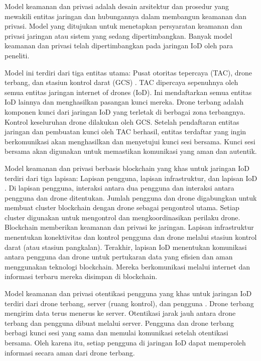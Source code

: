 Model keamanan dan privasi adalah desain arsitektur dan prosedur yang mewakili entitas jaringan dan hubungannya dalam membangun keamanan dan privasi. Model yang ditujukan untuk menetapkan persyaratan keamanan dan privasi jaringan atau sistem yang sedang dipertimbangkan. Banyak model keamanan dan privasi telah dipertimbangkan pada jaringan IoD oleh para peneliti.

Model ini terdiri dari tiga entitas utama: Pusat otoritas tepercaya (TAC), drone terbang, dan stasiun kontrol darat (GCS) \citep{tian2019efficient} \citep{yahuza2020systematic} \citep{chen2020traceable}. TAC dipercaya sepenuhnya oleh semua entitas jaringan internet of drones (IoD). Ini mendaftarkan semua entitas IoD lainnya dan menghasilkan pasangan kunci mereka. Drone terbang adalah komponen kunci dari jaringan IoD yang terletak di berbagai zona terbangnya. Kontrol keseluruhan drone dilakukan oleh GCS. Setelah pendaftaran entitas jaringan dan pembuatan kunci oleh TAC berhasil, entitas terdaftar yang ingin berkomunikasi akan menghasilkan dan menyetujui kunci sesi bersama. Kunci sesi bersama akan digunakan untuk memastikan komunikasi yang aman dan autentik. 

Model keamanan dan privasi berbasis blockchain yang khas untuk jaringan IoD terdiri dari tiga lapisan: Lapisan pengguna, lapisan infrastruktur, dan lapisan IoD \citep{bera2021private}. Di lapisan pengguna, interaksi antara dua pengguna dan interaksi antara pengguna dan drone ditentukan. Jumlah pengguna dan drone digabungkan untuk membuat cluster blockchain dengan drone sebagai pengontrol utama. Setiap cluster digunakan untuk mengontrol dan mengkoordinasikan perilaku drone. Blockchain memberikan keamanan dan privasi ke jaringan. Lapisan infrastruktur menentukan konektivitas dan kontrol pengguna dan drone melalui stasiun kontrol darat (atau stasiun pangkalan). Terakhir, lapisan IoD menentukan komunikasi antara pengguna dan drone untuk pertukaran data yang efisien dan aman menggunakan teknologi blockchain. Mereka berkomunikasi melalui internet dan informasi terbaru mereka disimpan di blockchain.

Model keamanan dan privasi otentikasi pengguna yang khas untuk jaringan IoD terdiri dari drone terbang, server (ruang kontrol), dan pengguna \citep{wazid2018design}. Drone terbang mengirim data terus menerus ke server. Otentikasi jarak jauh antara drone terbang dan pengguna dibuat melalui server. Pengguna dan drone terbang berbagi kunci sesi yang sama dan memulai komunikasi setelah otentikasi bersama. Oleh karena itu, setiap pengguna di jaringan IoD dapat memperoleh informasi secara aman dari drone terbang.

